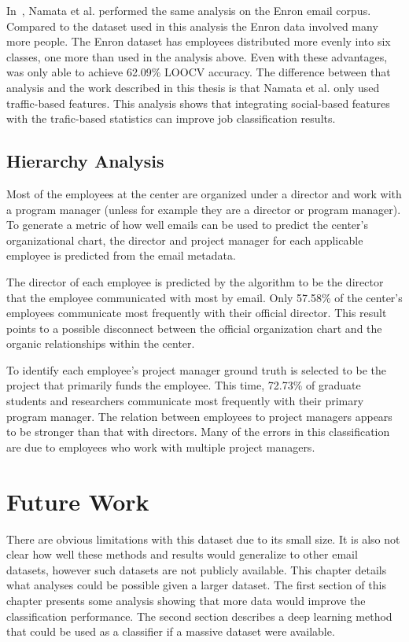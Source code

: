 \documentclass[12pt]{report}
\begin{document}
In~\cite{namata_inferring_2006}, Namata et al. performed the same analysis on the Enron email corpus.
Compared to the dataset used in this analysis the Enron data involved many more people.
The Enron dataset has employees distributed more evenly into six classes, one more than used in the analysis above.
Even with these advantages, \cite{namata_inferring_2006} was only able to achieve 62.09\% LOOCV accuracy.
The difference between that analysis and the work described in this thesis is that Namata et al. only used traffic-based features.
This analysis shows that integrating social-based features with the trafic-based statistics can improve job classification results.

\section{Hierarchy Analysis}
Most of the employees at the center are organized under a director and work with a program manager (unless for example they are a director or program manager).
To generate a metric of how well emails can be used to predict the center's organizational chart, the director and project manager for each applicable employee is predicted from the email metadata. 

The director of each employee is predicted by the algorithm to be the director that the employee communicated with most by email.
Only 57.58\% of the center's employees communicate most frequently with their official director.
This result points to a possible disconnect between the official organization chart and the organic relationships within the center.

To identify each employee's project manager ground truth is selected to be the project that primarily funds the employee.
This time, 72.73\% of graduate students and researchers communicate most frequently with their primary program manager.
The relation between employees to project managers appears to be stronger than that with directors.
Many of the errors in this classification are due to employees who work with multiple project managers.  

\chapter{Future Work} \label{FutureWork}
There are obvious limitations with this dataset due to its small size.
It is also not clear how well these methods and results would generalize to other email datasets, however such datasets are not publicly available.
This chapter details what analyses could be possible given a larger dataset.
The first section of this chapter presents some analysis showing that more data would improve the classification performance.
The second section describes a deep learning method that could be used as a classifier if a massive dataset were available.
\end{document}

